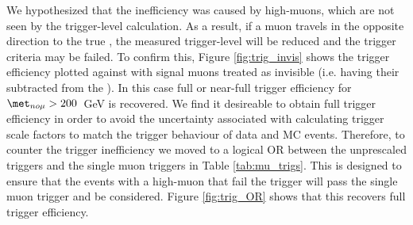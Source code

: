 We hypothesized that the inefficiency was caused by high-\pT muons, which are not seen by the trigger-level \met calculation. As a result, if a muon travels in the opposite direction to the true \met, the measured trigger-level \met will be reduced and the trigger criteria may be failed. To confirm this, Figure \ref{fig:trig_invis} shows the \met trigger efficiency plotted against \met with signal muons treated as invisible (i.e. having their \pt subtracted from the \met). In this case full or near-full trigger efficiency for $\met_{no \mu} > 200$~GeV is recovered. We find it desireable to obtain full trigger efficiency in order to avoid the uncertainty associated with calculating trigger scale factors to match the trigger behaviour of data and MC events. Therefore, to counter the trigger inefficiency we moved to a logical OR between the unprescaled \met triggers and the single muon triggers in Table \ref{tab:mu_trigs}. This is designed to ensure that the events with a high-\pT muon that fail the \met trigger will pass the single muon trigger and be considered. Figure \ref{fig:trig_OR} shows that this recovers full trigger efficiency.


